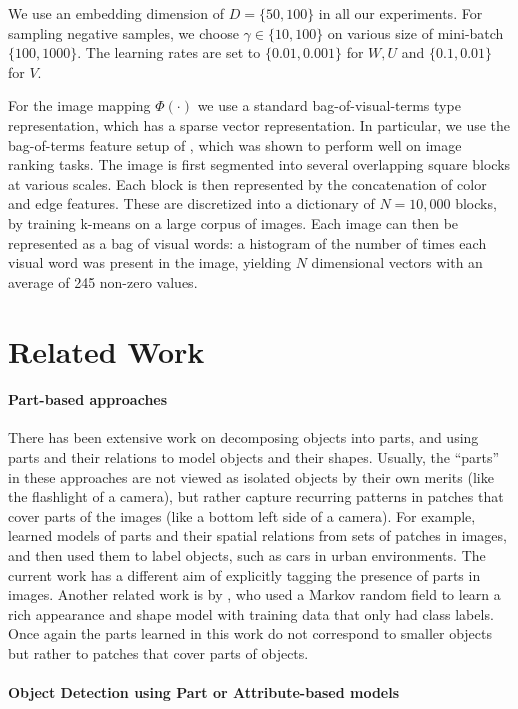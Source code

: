 We use an embedding dimension of $D=\{ 50,100 \}$ in all our experiments. For
sampling negative samples, we choose $\gamma\in\{10,100\}$ on various size of
mini-batch $\{100,1000\}$. The learning rates are set to $\{0.01,0.001\}$ for
$W,U$ and $\{0.1,0.01\}$ for $V$. 

For the image mapping $\Phi(\cdot)$ we use a
standard bag-of-visual-terms type representation, which has
a sparse vector representation. In particular, we use the bag-of-terms 
feature setup of \citep{grangier:2008:tpami}, which
was shown to perform well on image ranking tasks. 
The image is first segmented into several overlapping square blocks at various scales.
Each block is then represented by the concatenation of color and edge features.
These are discretized into a dictionary of $N = 10,000$ blocks,
by training k-means on a large corpus of images. Each image
can then be represented as a bag of visual words: a histogram
of the number of times each visual word was present in the
image, yielding $N$ dimensional vectors with an average of 245 non-zero values. 

\section{Related Work}\label{sec:rwork}

\paragraph{Part-based approaches}
There has been extensive work on decomposing objects into parts, and
using parts and their relations to model objects and their shapes.
Usually, the ``parts'' in these approaches are not viewed as isolated
objects by their own merits (like the flashlight of a camera), but
rather capture recurring patterns in patches that cover parts of the
images (like a bottom left side of a camera).
%
For example, \citep{agarwal2004learning} learned
models of parts and their spatial relations from sets of patches in
images, and then used them to label objects, such as cars in urban
environments. The current work has a different aim of explicitly
tagging the presence of parts in images. Another related work is by
\citep{crandall2006weakly}, who used a Markov random field to learn a
rich appearance and shape model with training data that only had class
labels. Once again the parts learned in this work do not correspond to
smaller objects but rather to patches that cover parts of objects.

\paragraph{Object Detection using Part or Attribute-based models}

